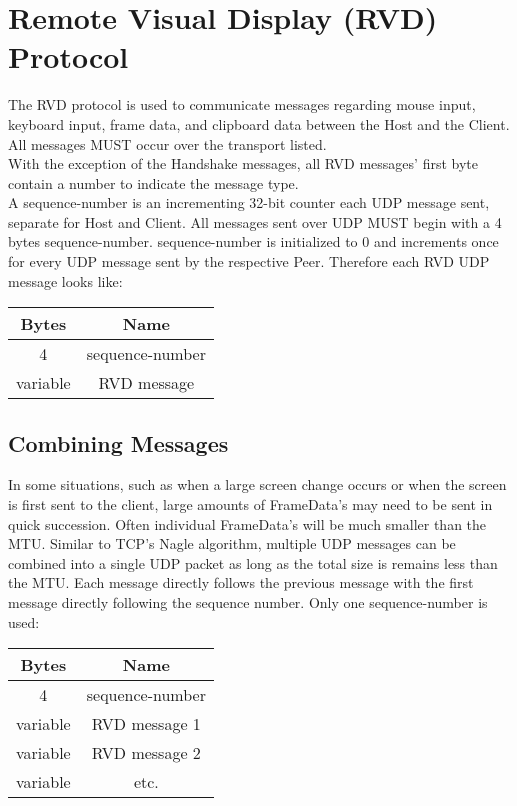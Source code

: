 \section{Remote Visual Display (RVD) Protocol}

The RVD protocol is used to communicate messages regarding mouse input, keyboard input, frame data, and clipboard data between the
Host and the Client.\\

All messages MUST occur over the transport listed.\\

With the exception of the Handshake messages, all RVD messages' first byte contain a number to indicate
the message type. \\

A sequence-number is an incrementing 32-bit counter each UDP message sent, separate for Host and Client. All
messages sent over UDP MUST begin with a 4 bytes sequence-number. sequence-number is initialized
to 0 and increments once for every UDP message sent by the respective Peer. Therefore each RVD UDP message looks
like:

\begin{center}
    \begin{tabular}{|c|c|}
        \hline
        \textbf{Bytes} & \textbf{Name}   \\
        \hline
        4              & sequence-number \\
        \hline
        variable       & RVD message     \\
        \hline
    \end{tabular}
\end{center}

\subsection{Combining Messages}

In some situations, such as when a large screen change occurs or when the screen is first sent to the client,
large amounts of FrameData's may need to be sent in quick succession. Often individual FrameData's
will be much smaller than the MTU. Similar to TCP's Nagle algorithm, multiple UDP messages can be combined into a
single UDP packet as long as the total size is remains less than the MTU. Each message directly follows the
previous message with the first message directly following the sequence number. Only one sequence-number
is used:

\begin{center}
    \begin{tabular}{|c|c|}
        \hline
        \textbf{Bytes} & \textbf{Name}   \\
        \hline
        4              & sequence-number \\
        \hline
        variable       & RVD message 1   \\
        \hline
        variable       & RVD message 2   \\
        \hline
        \hline
        variable       & etc.            \\
        \hline
    \end{tabular}
\end{center}

